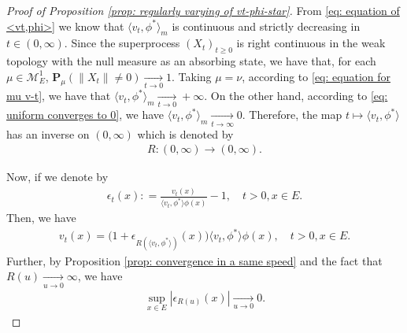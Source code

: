 \begin{proof}[Proof of Proposition \ref{prop: regularly varying of vt-phi-star}]
	
	From \eqref{eq: equation of <vt,phi>} we know that $\langle v_t,\phi^* \rangle_m$ is continuous and strictly decreasing in $t \in (0,\infty)$.
	Since the superprocess $(X_t)_{t\geq 0}$ is right continuous in the weak topology with the null measure as an absorbing state, we have that, for each $\mu \in \mathcal M_E^1$,
	$\mathbf P_\mu (\|X_t\| \neq 0) \xrightarrow[t\to 0]{} 1$.
	Taking $\mu = \nu$, according to \eqref{eq: equation for mu v-t}, we have that $\langle v_{t}, \phi^*\rangle_m \xrightarrow[t\to 0]{} +\infty$.
	On the other hand, according to \eqref{eq: uniform converges to 0}, we have $\langle v_{t}, \phi^*\rangle_m \xrightarrow[t\to \infty]{} 0$.
	Therefore, the map $t\mapsto \langle v_t,\phi^*  \rangle$ has an inverse on $(0,\infty)$ which is denoted by
\begin{align}
	R: (0,\infty) \to (0,\infty).
\end{align}
	
	Now, if we denote by
\begin{align}
	\epsilon_{t}(x)
	: = \frac{v_t(x)}{\langle v_t, \phi^*\rangle \phi(x)} - 1,
	\quad t>0, x\in E.
\end{align}
	Then, we have
\begin{align}\label{eq: change variable using inverse}
	v_t(x)
	= \big(1+ \epsilon_{R(\langle v_t,\phi^* \rangle)}(x) \big )\langle v_t,\phi^* \rangle \phi(x),
	\quad t>0, x\in E.
\end{align}
	Further, by Proposition \ref{prop: convergence in a same speed} and
	the fact that $R(u)\xrightarrow[u\to 0]{} \infty$, we have
\begin{align}\label{eq: epsilon R converges to 0}
	\sup_{x\in E}|\epsilon_{R(u)}(x)|
	\xrightarrow[u\to 0]{} 0.
\end{align}


\end{proof}
